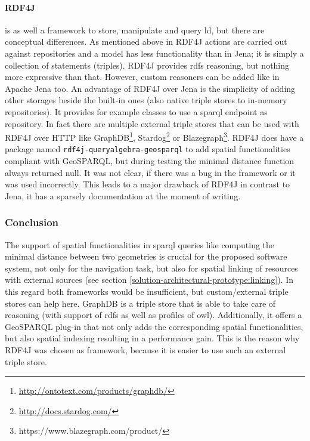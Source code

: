 \documentclass[draft,final]{vutinfth} %
\begin{document}
\paragraph{RDF4J} is as well a framework to store, manipulate and query \gls{ld}, but there are conceptual differences. As mentioned above in RDF4J actions are carried out against repositories and a model has less functionality than in Jena; it is simply a collection of statements (triples). RDF4J provides \gls{rdfs} reasoning, but nothing more expressive than that. However, custom reasoners can be added like in Apache Jena too. An advantage of RDF4J over Jena is the simplicity of adding other storages beside the built-in ones (also native triple stores to in-memory repositories). It provides for example classes to use a \gls{sparql} endpoint as repository. In fact there are multiple external triple stores that can be used with RDF4J over HTTP like GraphDB\footnote{\url{http://ontotext.com/products/graphdb/}}, Stardog\footnote{\url{http://docs.stardog.com/}} or Blazegraph\footnote{https://www.blazegraph.com/product/}. RDF4J does have a package named \texttt{rdf4j-queryalgebra-geosparql} to add spatial functionalities compliant with GeoSPARQL, but during testing the minimal distance function always returned null. It was not clear, if there was a bug in the framework or it was used incorrectly. This leads to a major drawback of RDF4J in contrast to Jena, it has a sparsely documentation at the moment of writing.

\subsubsection{Conclusion}

The support of spatial functionalities in \gls{sparql} queries like computing the minimal distance between two geometries is crucial for the proposed software system, not only for the navigation task, but also for spatial linking of resources with external sources (see section \ref{solution-architectural-prototype:linking}). In this regard both frameworks would be insufficient, but custom/external triple stores can help here. GraphDB is a triple store that is able to take care of reasoning (with support of \gls{rdfs} as well as profiles of \gls{owl}). Additionally, it offers a GeoSPARQL plug-in that not only adds the corresponding spatial functionalities, but also spatial indexing resulting in a performance gain. This is the reason why RDF4J was chosen as framework, because it is easier to use such an external triple store.
\end{document}
